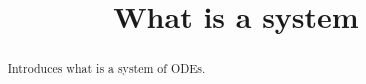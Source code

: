 \documentclass{ximera}
\title{What is a system}
\begin{document}
\begin{abstract}
Introduces what is a system of ODEs.
\end{abstract}
\maketitle
\end{document}
